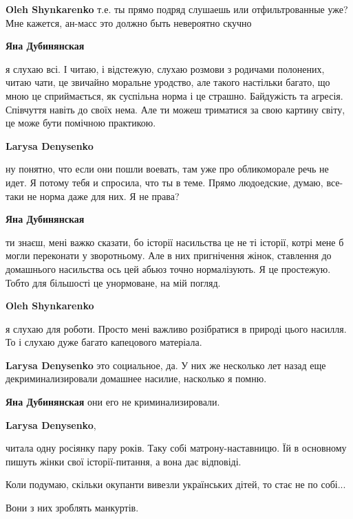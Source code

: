 \begin{itemize}
\begin{itemize}
\textbf{Oleh Shynkarenko} т.е. ты прямо подряд слушаешь или отфильтрованные уже? Мне кажется, ан-масс это должно быть невероятно скучно

\textbf{Яна Дубинянская} 

я слухаю всі. І читаю, і відстежую, слухаю розмови з родичами полонених, читаю
чати, це звичайно моральне уродство, але такого настільки багато, що мною це
сприймається, як суспільна норма і це страшно. Байдужість та агресія. Співчуття
навіть до своїх нема. Але ти можеш триматися за свою картину світу, це може
бути помічною практикою.

\textbf{Larysa Denysenko} 

ну понятно, что если они пошли воевать, там уже про обликоморале речь не идет.
Я потому тебя и спросила, что ты в теме. Прямо людоедские, думаю, все-таки не
норма даже для них. Я не права?

\textbf{Яна Дубинянская} 

ти знаєш, мені важко сказати, бо історії насильства це не ті історії, котрі
мене б могли переконати у зворотньому. Але в них пригнічення жінок, ставлення
до домашнього насильства ось цей абьюз точно нормалізують. Я це простежую.
Тобто для більшості це унормоване, на мій погляд.

\textbf{Oleh Shynkarenko} 

я слухаю для роботи. Просто мені важливо розібратися в природі цього насилля.
То і слухаю дуже багато капецового матеріала.

\textbf{Larysa Denysenko} это социальное, да. У них же несколько лет назад еще декриминализировали домашнее насилие, насколько я помню.

\textbf{Яна Дубинянская} они его не криминализировали.

\textbf{Larysa Denysenko}, 

читала одну росіянку пару років. Таку собі матрону-наставницю. Їй в основному
пишуть жінки свої історії-питання, а вона дає відповіді.
\end{itemize} %


Коли подумаю, скільки окупанти вивезли українських дітей, то стає не по собі...

Вони з них зроблять манкуртів.



\end{itemize}
